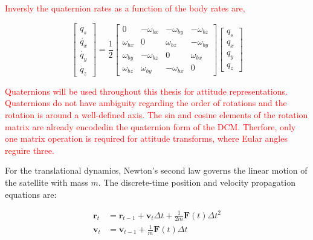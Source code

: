 \textcolor{red}{Inversly the quaternion rates as a function of the body rates are,}

\begin{equation}
    \begin{bmatrix}
        \dot{q_s} \\ \dot{q_x} \\ \dot{q_y} \\ \dot{q_z}
    \end{bmatrix}
    =
    \frac{1}{2}
    \begin{bmatrix}
        0 & -\omega_{bx} & -\omega_{by} & -\omega_{bz}\\
        \omega_{bx} & 0 & \omega_{bz} & -\omega_{by}\\
        \omega_{by} & -\omega_{bz} & 0 & \omega_{bx}\\
        \omega_{bz} & \omega_{by} & -\omega_{bx} & 0 
    \end{bmatrix}
    \begin{bmatrix}
        q_s \\ q_x \\ q_y \\ q_z
    \end{bmatrix}
\end{equation}

\textcolor{red}{Quaternions will be used throughout this thesis for attitude representations. Quaternions do not have ambiguity regarding the order of rotations
and the rotation is around a well-defined axis. The sin and cosine elements of the rotation matrix are already encodedin the quaternion form of the DCM. Therfore,
only one matrix operation is required for attitude transforms, where Eular angles reguire three.}


\label{sec:dynamics}


For the translational dynamics, Newton's second law governs the linear motion of the satellite with mass $m$. The discrete-time position and velocity propagation equations are:

\begin{align}
\mathbf{r}_t &= \mathbf{r}_{t-1} + \mathbf{v}_t\Delta t + \frac{1}{2m}\mathbf{F}(t)\Delta t^2 \\
\mathbf{v}_t &= \mathbf{v}_{t-1} + \frac{1}{m}\mathbf{F}(t)\Delta t
\end{align}

